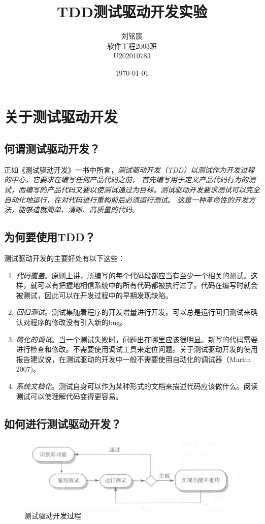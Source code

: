 \documentclass[a4paper]{article}
\title{TDD测试驱动开发实验}
\author{刘铭宸\\软件工程2003班\\U202010783}
\date{\today}
\begin{document}
\begin{titlepage}
\maketitle
\end{titlepage}

\tableofcontents

\newpage
\section{关于测试驱动开发}
\subsection{何谓测试驱动开发？}
正如《测试驱动开发》一书中所言，\emph{测试驱动开发（TDD）以测试作为开发过程的中心，它要求在编写任何产品代码之前，
首先编写用于定义产品代码行为的测试，而编写的产品代码又要以使测试通过为目标。测试驱动开发要求测试可以完全自动化地运行，在对代码进行重构前后必须运行测试。
这是一种革命性的开发方法，能够造就简单、清晰、高质量的代码。}
\subsection{为何要使用TDD？}
测试驱动开发的主要好处有以下这些：
\begin{enumerate}
    \item \emph{代码覆盖}。原则上讲，所编写的每个代码段都应当有至少一个相关的测试。这样，就可以有把握地相信系统中的所有代码都被执行过了。代码在编写时就会被测试，因此可以在开发过程中的早期发现缺陷。
    \item \emph{回归测试}。测试集随着程序的开发增量进行开发。可以总是运行回归测试来确认对程序的修改没有引入新的bug。
    \item \emph{简化的调试}。当一个测试失败时，问题出在哪里应该很明显。新写的代码需要进行检查和修改。不需要使用调试工具来定位问题。关于测试驱动开发的使用报告建议说，在测试驱动的开发中一般不需要使用自动化的调试器（Martin 2007)。
    \item \emph{系统文档化}。测试自身可以作为某种形式的文档来描述代码应该做什么。阅读测试可以使理解代码变得更容易。 
\end{enumerate}

\subsection{如何进行测试驱动开发？}
\begin{figure}[b]
    \centering
    \includegraphics[scale=0.4]{pic01.png}
    \caption{测试驱动开发过程}
    \label{fig:1}
\end{figure}
\newpage
\end{document}
